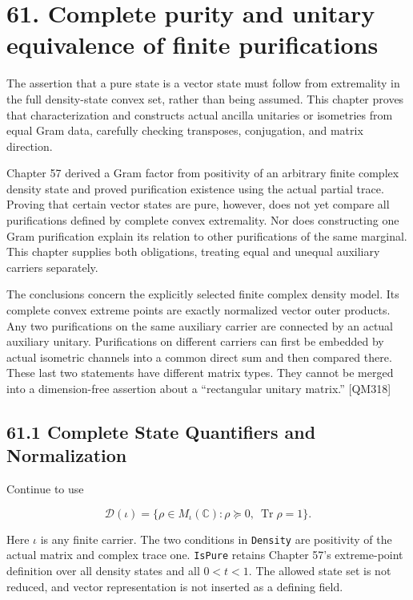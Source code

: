 \documentclass[
  11pt,
  oneside]{book}
\begin{document}
\chapter{61. Complete purity and unitary equivalence of finite
purifications}\label{ch-61}

The assertion that a pure state is a vector state must follow from
extremality in the full density-state convex set, rather than being
assumed. This chapter proves that characterization and constructs actual
ancilla unitaries or isometries from equal Gram data, carefully checking
transposes, conjugation, and matrix direction.

Chapter 57 derived a Gram factor from positivity of an arbitrary finite
complex density state and proved purification existence using the actual
partial trace. Proving that certain vector states are pure, however,
does not yet compare all purifications defined by complete convex
extremality. Nor does constructing one Gram purification explain its
relation to other purifications of the same marginal. This chapter
supplies both obligations, treating equal and unequal auxiliary carriers
separately.

The conclusions concern the explicitly selected finite complex density
model. Its complete convex extreme points are exactly normalized vector
outer products. Any two purifications on the same auxiliary carrier are
connected by an actual auxiliary unitary. Purifications on different
carriers can first be embedded by actual isometric channels into a
common direct sum and then compared there. These last two statements
have different matrix types. They cannot be merged into a dimension-free
assertion about a ``rectangular unitary matrix.'' {[}QM318{]}

\section{61.1 Complete State Quantifiers and Normalization}

Continue to use

\[
\mathcal D(\iota)=\{\rho\in M_\iota(\mathbb C):\rho\succeq0,\ \operatorname{Tr}\rho=1\}.
\]

Here \(\iota\) is any finite carrier. The two conditions in
\texttt{Density} are positivity of the actual matrix and complex trace
one. \texttt{Is\allowbreak Pure} retains Chapter 57's extreme-point definition over
all density states and all \(0<t<1\). The allowed state set is not
reduced, and vector representation is not inserted as a defining field.
\end{document}
